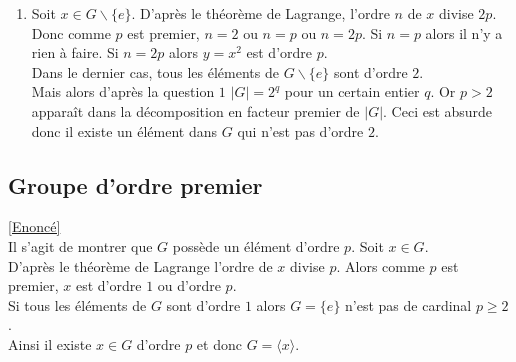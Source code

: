 \documentclass[8pt]{book}
\begin{document}
\begin{enumerate}[leftmargin=*]
\begin{enumerate}[label=\alph*.]
		\end{enumerate}
		\item Soit $x\in G\backslash\{e\}$. D'après le théorème de Lagrange, l'ordre $n$ de $x$ divise $2p$. Donc comme $p$ est premier, $n=2$ ou $n=p$ ou $n=2p$. Si $n=p$ alors il n'y a rien à faire. Si $n=2p$ alors $y=x^2$ est d'ordre $p$.\\
		Dans le dernier cas, tous les éléments de $G\backslash\{e\}$ sont d'ordre $2$.\\
		Mais alors d'après la question $1$ $|G|=2^q$ pour un certain entier $q$. Or $p>2$ apparaît dans la décomposition en facteur premier de $|G|$. Ceci est absurde donc il existe un élément dans $G$ qui n'est pas d'ordre $2$.
	\end{enumerate}
	
	\subsection{Groupe d'ordre premier }
	\label{Groupe d'ordre premier corrigé}
	\textcolor{blue}{\hyperref[Groupe d'ordre premier]{[Enoncé]}}\\
	Il s'agit de montrer que $G$ possède un élément d'ordre $p$. Soit $x\in G$.\\
	D'après le théorème de Lagrange l'ordre de $x$ divise $p$. Alors comme $p$ est premier, $x$ est d'ordre $1$ ou d'ordre $p$.\\
	Si tous les éléments de $G$ sont d'ordre $1$ alors $G=\{e\}$ n'est pas de cardinal $p\geq 2$.\\
	Ainsi il existe $x\in G$ d'ordre $p$ et donc $G=\langle x\rangle$.
	
\end{document}
